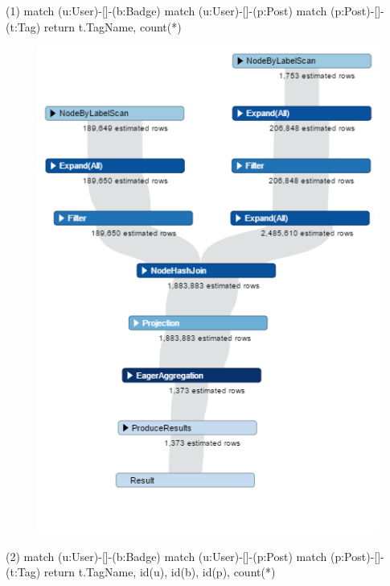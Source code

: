 (1) match (u:User)-[]-(b:Badge)  match (u:User)-[]-(p:Post)  match (p:Post)-[]-(t:Tag)  return  t.TagName, count(*)

\begin {figure}[H]
\centering
\includegraphics[scale=0.6]{pic/61.png}
\end{figure}

(2) match (u:User)-[]-(b:Badge)  match (u:User)-[]-(p:Post)  match (p:Post)-[]-(t:Tag)  return  t.TagName, id(u), id(b), id(p), count(*)

